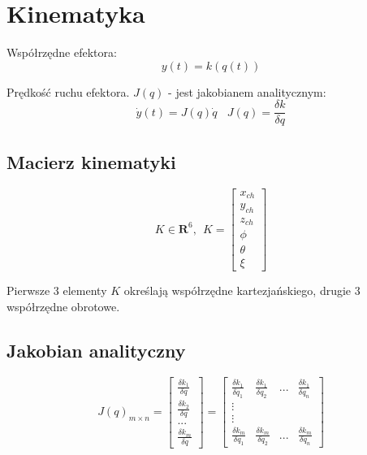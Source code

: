 \documentclass{article}
\begin{document}
\section{Kinematyka}

Współrzędne efektora:
$$
    y(t) = k( q(t) )
$$

Prędkość ruchu efektora. $J(q)$ - jest jakobianem analitycznym:
$$
    \dot{y}(t) = J(q) \dot{q}
    \ \ \ \
    J(q) = \frac{\delta k}{\delta q}
$$

\subsection{Macierz kinematyki}
\Large
$$
    K \in \textbf{R}^6, \ \
    K = \begin{bmatrix}
        x_{ch} \\
        y_{ch} \\
        z_{ch} \\
        \phi   \\
        \theta \\
        \xi
    \end{bmatrix}
$$
\normalsize

Pierwsze 3 elementy $K$ określają współrzędne kartezjańskiego, drugie 3 współrzędne obrotowe.

\subsection{Jakobian analityczny}
\Large
$$
    J(q)_{m\times n} = \begin{bmatrix}
        \frac{\delta k_1}{\delta q} \\
        \frac{\delta k_2}{\delta q} \\
        ...                         \\
        \frac{\delta k_m}{\delta q}
    \end{bmatrix}
    = \begin{bmatrix}
        \frac{\delta k_1}{\delta q_1} &
        \frac{\delta k_1}{\delta q_2} &
        ...                           &
        \frac{\delta k_1}{\delta q_n}   \\
        \vdots                          \\
        \vdots                          \\
        \frac{\delta k_m}{\delta q_1} &
        \frac{\delta k_m}{\delta q_2} &
        ...                           &
        \frac{\delta k_m}{\delta q_n}
    \end{bmatrix}
$$
\normalsize
\end{document}
